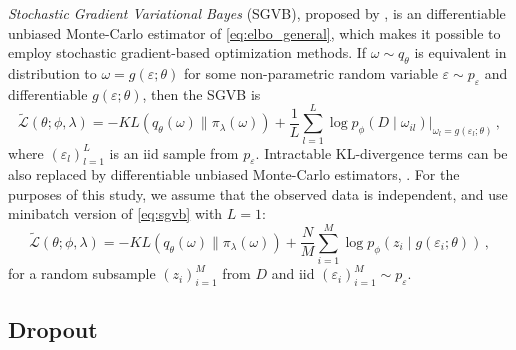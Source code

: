 \documentclass[a4paper,10pt]{article}
\begin{document}
\textit{Stochastic Gradient Variational Bayes} (SGVB), proposed by \cite{kingma_auto-encoding_2014},
is an differentiable unbiased Monte-Carlo estimator of \eqref{eq:elbo_general}, which makes
it possible to employ stochastic gradient-based optimization methods. If $
  \omega \sim q_{\theta}
$ is equivalent in distribution to $
  \omega = g(\varepsilon; \theta)
$ for some non-parametric random variable $
    \varepsilon \sim p_\varepsilon
$ and differentiable $
  g(\varepsilon; \theta)
$, then the SGVB is
\begin{equation} \label{eq:sgvb}
  \widetilde{\mathcal{L}}(\theta; \phi, \lambda)
    = - KL(q_{\theta}(\omega) \| \pi_{\lambda}(\omega))
      + \frac1{L} \sum_{l=1}^L
        \log p_{\phi}(D \mid \omega_{il})
          \Big\vert_{\omega_{l} = g(\varepsilon_{l}; \theta)}
    \,, 
\end{equation}
where $
  (\varepsilon_{l})_{l=1}^L
$ is an iid sample from $p_\varepsilon$. Intractable KL-divergence terms can be also
replaced by differentiable unbiased Monte-Carlo estimators, \cite{kingma_auto-encoding_2014}.
%
For the purposes of this study, we assume that the observed data is independent, and
use minibatch version of \eqref{eq:sgvb} with $L=1$:
\begin{equation} \label{eq:elbo}
  \widetilde{\mathcal{L}}(\theta; \phi, \lambda)
    = - KL(q_{\theta}(\omega) \| \pi_{\lambda}(\omega))
      + \frac{N}{M} \sum_{i=1}^M
        \log p_{\phi}(z_i \mid g(\varepsilon_i; \theta))
    \,,
\end{equation}
for a random subsample $(z_i)_{i=1}^M$ from $D$ and iid $
  (\varepsilon_i)_{i=1}^M \sim p_\varepsilon
$.

\subsection{Dropout} %
\label{sub:dropout}
\end{document}
